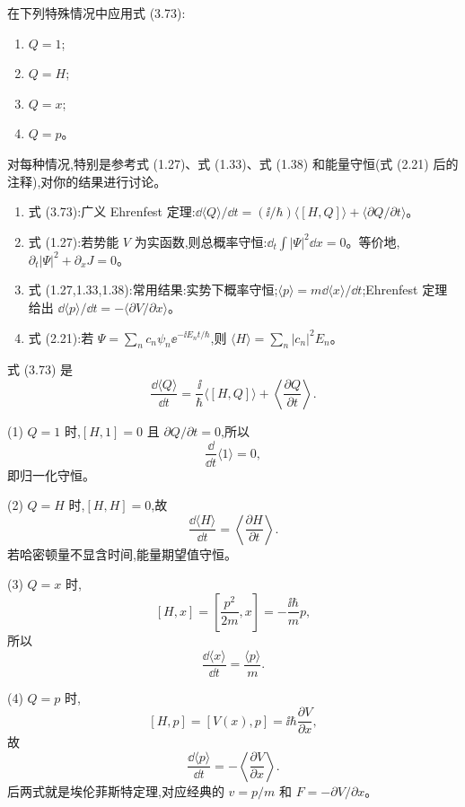 \begin{question}
在下列特殊情况中应用式 (3.73):
\begin{enumerate}
\item $Q=1$;
\item $Q=H$;
\item $Q=x$;
\item $Q=p$。
\end{enumerate}
对每种情况,特别是参考式 (1.27)、式 (1.33)、式 (1.38) 和能量守恒(式 (2.21) 后的注释),对你的结果进行讨论。

\par\smallskip
{}
\begin{enumerate}[leftmargin=2.2em,itemsep=0.12em,topsep=0.12em,parsep=0pt]
\item 式 (3.73):广义 Ehrenfest 定理:$\dd\langle Q\rangle/\dd t=(\ii/\hbar)\langle[H,Q]\rangle+\langle\partial Q/\partial t\rangle$。
\item 式 (1.27):若势能 $V$ 为实函数,则总概率守恒:$\dd_t\int |\Psi|^2\dd x=0$。等价地,$\partial_t|\Psi|^2+\partial_xJ=0$。
\item 式 (1.27,1.33,1.38):常用结果:实势下概率守恒;$\langle p\rangle=m\dd\langle x\rangle/\dd t$;Ehrenfest 定理给出 $\dd\langle p\rangle/\dd t=-\langle \partial V/\partial x\rangle$。
\item 式 (2.21):若 $\Psi=\sum_n c_n\psi_n \ee^{-\ii E_nt/\hbar}$,则 $\langle H\rangle=\sum_n |c_n|^2E_n$。
\end{enumerate}

\end{question}
\begin{solution}
式 (3.73) 是
\[
\frac{\dd\langle Q\rangle}{\dd t}
=\frac{\ii}{\hbar}\langle[H,Q]\rangle+\left\langle\frac{\partial Q}{\partial t}\right\rangle .
\]

(1) $Q=1$ 时,$[H,1]=0$ 且 $\partial Q/\partial t=0$,所以
\[
\frac{\dd}{\dd t}\langle 1\rangle=0,
\]
即归一化守恒。

(2) $Q=H$ 时,$[H,H]=0$,故
\[
\frac{\dd\langle H\rangle}{\dd t}=\left\langle\frac{\partial H}{\partial t}\right\rangle.
\]
若哈密顿量不显含时间,能量期望值守恒。

(3) $Q=x$ 时,
\[
[H,x]=\left[\frac{p^2}{2m},x\right]=-\frac{\ii\hbar}{m}p,
\]
所以
\[
\frac{\dd\langle x\rangle}{\dd t}=\frac{\langle p\rangle}{m}.
\]

(4) $Q=p$ 时,
\[
[H,p]=[V(x),p]=\ii\hbar\frac{\partial V}{\partial x},
\]
故
\[
\frac{\dd\langle p\rangle}{\dd t}=-\left\langle\frac{\partial V}{\partial x}\right\rangle.
\]
后两式就是埃伦菲斯特定理,对应经典的 $v=p/m$ 和 $F=-\partial V/\partial x$。
\end{solution}

